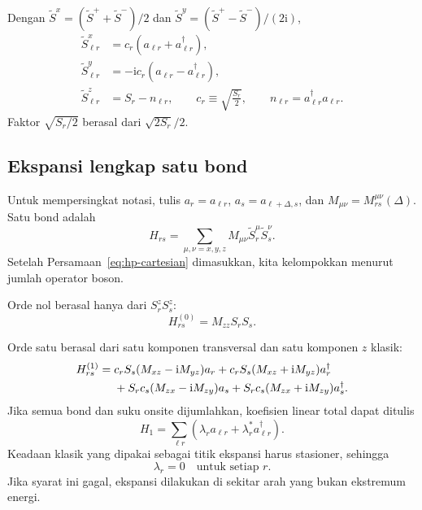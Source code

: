 \documentclass[11pt,a4paper]{article}
\newcommand{\ii}{\mathrm{i}}
\begin{document}
Dengan $\widetilde S^x=(\widetilde S^++\widetilde S^-)/2$ dan $\widetilde S^y=(\widetilde S^+-\widetilde S^-)/(2\ii)$,
\begin{align}
\widetilde S_{\ell r}^x
&=c_r(a_{\ell r}+a_{\ell r}^\dagger),\\
\widetilde S_{\ell r}^y
&=-\ii c_r(a_{\ell r}-a_{\ell r}^\dagger),\\
\widetilde S_{\ell r}^z
&=S_r-n_{\ell r},
\qquad
c_r\equiv\sqrt{\frac{S_r}{2}},
\qquad
n_{\ell r}=a_{\ell r}^\dagger a_{\ell r}.
\label{eq:hp-cartesian}
\end{align}
Faktor $\sqrt{S_r/2}$ berasal dari $\sqrt{2S_r}/2$.

\subsection{Ekspansi lengkap satu bond}

Untuk mempersingkat notasi, tulis $a_r=a_{\ell r}$, $a_s=a_{\ell+\Delta,s}$, dan $M_{\mu\nu}=M_{rs}^{\mu\nu}(\Delta)$. Satu bond adalah
\begin{equation}
H_{rs}=\sum_{\mu,\nu=x,y,z}M_{\mu\nu}\widetilde S_r^\mu\widetilde S_s^\nu.
\end{equation}
Setelah Persamaan~\eqref{eq:hp-cartesian} dimasukkan, kita kelompokkan menurut jumlah operator boson.

Orde nol berasal hanya dari $S_r^zS_s^z$:
\begin{equation}
H_{rs}^{(0)}=M_{zz}S_rS_s.
\label{eq:bond-order0}
\end{equation}

Orde satu berasal dari satu komponen transversal dan satu komponen $z$ klasik:
\begin{align}
H_{rs}^{(1)}={}&
c_rS_s(M_{xz}-\ii M_{yz})a_r
+c_rS_s(M_{xz}+\ii M_{yz})a_r^\dagger\notag\\
&+S_rc_s(M_{zx}-\ii M_{zy})a_s
+S_rc_s(M_{zx}+\ii M_{zy})a_s^\dagger.
\label{eq:bond-order1}
\end{align}
Jika semua bond dan suku onsite dijumlahkan, koefisien linear total dapat ditulis
\begin{equation}
H_1=\sum_{\ell r}(\lambda_r a_{\ell r}+\lambda_r^*a_{\ell r}^\dagger).
\end{equation}
Keadaan klasik yang dipakai sebagai titik ekspansi harus stasioner, sehingga
\begin{equation}
\boxed{\lambda_r=0\quad\text{untuk setiap }r.}
\label{eq:stationarity-linear}
\end{equation}
Jika syarat ini gagal, ekspansi dilakukan di sekitar arah yang bukan ekstremum energi.
\end{document}
